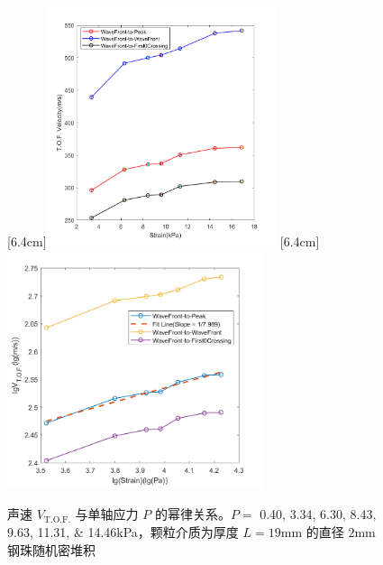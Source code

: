 \begin{figure}[!hbtp]
  \centering
                  [6.4cm]{\includegraphics[height=7cm]{figures/2_strain_vs_velocity_20mm_1.png}}
  \hspace{1cm}
                  [6.4cm]{\includegraphics[height=7cm]{figures/2_strain_vs_velocity_20mm_2.png}}
  \caption{声速 $V_{\text{T.O.F.}}$ 与单轴应力 $P$ 的幂律关系。$P =$ \numlist{0.40;3.34;6.30;8.43;9.63;11.31;14.46}\unit{\kilo\pascal}，颗粒介质为厚度 $L =19$\unit{\milli\meter} 的直径 $2$\unit{\milli\meter} 钢珠随机密堆积}
  \label{fig:normalized_width_versus_P}
\end{figure}

